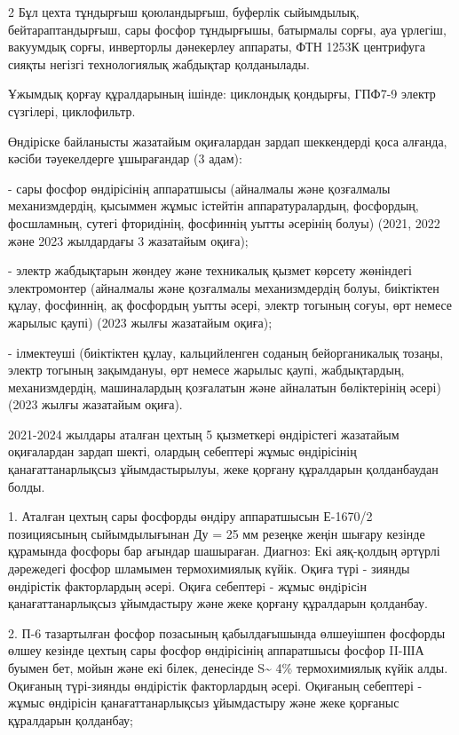 \begin{multicols}{2}
Бұл цехта тұндырғыш қоюландырғыш, буферлік сыйымдылық,
бейтараптандырғыш, сары фосфор тұндырғышы, батырмалы сорғы, ауа үрлегіш,
вакуумдық сорғы, инверторлы дәнекерлеу аппараты, ФТН 1253К центрифуга
сияқты негізгі технологиялық жабдықтар қолданылады.

Ұжымдық қорғау құралдарының ішінде: циклондық қондырғы, ГПФ7-9 электр
сүзгілері, циклофильтр.

Өндіріске байланысты жазатайым оқиғалардан зардап шеккендерді қоса
алғанда, кәсіби тәуекелдерге ұшырағандар (3 адам):

- сары фосфор өндірісінің аппаратшысы (айналмалы және қозғалмалы
механизмдердің, қысыммен жұмыс істейтін аппаратуралардың, фосфордың,
фосшламның, сутегі фторидінің, фосфиннің уытты әсерінің болуы) (2021,
2022 және 2023 жылдардағы 3 жазатайым оқиға);

- электр жабдықтарын жөндеу және техникалық қызмет көрсету жөніндегі
электромонтер (айналмалы және қозғалмалы механизмдердің болуы,
биіктіктен құлау, фосфиннің, ақ фосфордың уытты әсері, электр тогының
соғуы, өрт немесе жарылыс қаупі) (2023 жылғы жазатайым оқиға);

- ілмектеуші (биіктіктен құлау, кальцийленген соданың бейорганикалық
тозаңы, электр тогының зақымдануы, өрт немесе жарылыс қаупі,
жабдықтардың, механизмдердің, машиналардың қозғалатын және айналатын
бөліктерінің әсері) (2023 жылғы жазатайым оқиға).

2021-2024 жылдары аталған цехтың 5 қызметкері өндірістегі жазатайым
оқиғалардан зардап шекті, олардың себептері жұмыс өндірісінің
қанағаттанарлықсыз ұйымдастырылуы, жеке қорғану құралдарын қолданбаудан
болды.

1. Аталған цехтың сары фосфорды өндіру аппаратшысын Е-1670/2
позициясының сыйымдылығынан Ду = 25 мм резеңке жеңін шығару кезінде
құрамында фосфоры бар ағындар шашыраған. Диагноз: Екі аяқ-қолдың әртүрлі
дәрежедегі фосфор шламымен термохимиялық күйік. Оқиға түрі - зиянды
өндірістік факторлардың әсері. Оқиға себептерi - жұмыс өндiрiсiн
қанағаттанарлықсыз ұйымдастыру және жеке қорғану құралдарын қолданбау.

2. П-6 тазартылған фосфор позасының қабылдағышында өлшеуішпен фосфорды
өлшеу кезінде цехтың сары фосфор өндірісінің аппаратшысы фосфор II-ІІІА
буымен бет, мойын және екі білек, денесінде S\textasciitilde{} 4\%
термохимиялық күйік алды. Оқиғаның түрі-зиянды өндірістік факторлардың
әсері. Оқиғаның себептері - жұмыс өндірісін қанағаттанарлықсыз
ұйымдастыру және жеке қорғаныс құралдарын қолданбау;


\end{multicols}
